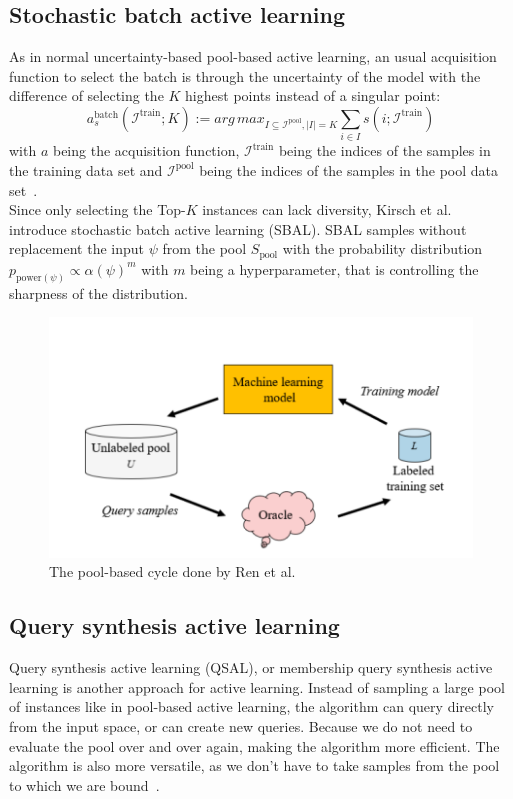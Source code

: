 \subsection{Stochastic batch active learning}
As in normal uncertainty-based pool-based active learning, 
an usual acquisition function to select the batch is 
through the uncertainty of the model with the difference 
of selecting the $K$ highest points instead of a singular point: 
\[
a_s^{\text{batch}}(\mathcal{I}^{\text{train}};K) := arg\,max_{I\subseteq\mathcal{I}^{\text{pool}},\lvert I\rvert = K}\sum_{i\in I}s(i;\mathcal{I}^{\text{train}})
\]    
with $a$ being the acquisition function, 
$\mathcal{I}^{\text{train}}$ being the indices of the samples 
in the training data set and $\mathcal{I}^{\text{pool}}$ being the indices 
of the samples in the pool data set~\cite{kirsch2021stochastic}.\\
Since only selecting the Top-$K$ instances can lack diversity, 
Kirsch et al.~\cite{kirsch2021stochastic} introduce stochastic batch 
active learning (SBAL). SBAL samples without replacement the input 
$\psi$ from the pool $S_{\text{pool}}$ with the probability distribution 
$p_{\text{power}(\psi)}\propto\alpha(\psi)^m$  with $m$ being a 
hyperparameter, that is controlling the sharpness of the distribution.

\begin{figure}
    \centering
    \includegraphics[width=1\linewidth]{../graphics/pool-based.png}
    \caption{The pool-based cycle done by Ren et al.~\cite{ren2021survey}}
    \label{fig:AL-pool}
\end{figure}


\subsection{Query synthesis active learning}
Query synthesis active learning (QSAL), 
or membership query synthesis active learning 
is another approach for active learning. 
Instead of sampling a large pool of instances 
like in pool-based active learning, 
the algorithm can query directly from the input space, 
or can create new queries. Because we do not need to 
evaluate the pool over and over again, making the 
algorithm more efficient. The algorithm is also more versatile, 
as we don't have to take samples from the pool to which we are bound~\cite{wang2015active}.
